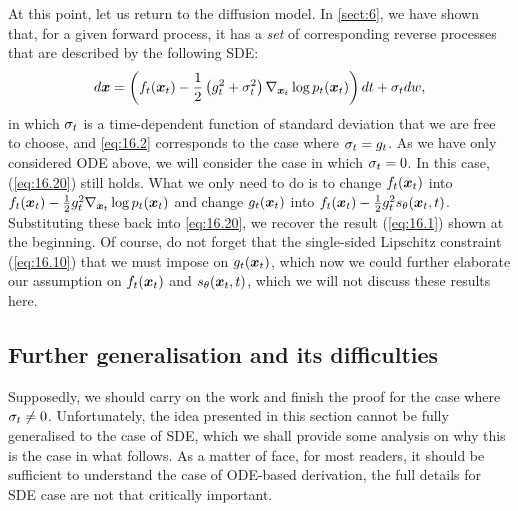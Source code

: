 At this point, let us return to the diffusion model. In \cref{sect:6}, we have shown that, for a given forward process, it has a \emph{set} of corresponding reverse processes that are described by the following SDE:
\begin{equation}
    \label{eq:16.21}
    d\bm{x}=\left(f_t(\bm{x}_{t})-\frac{1}{2}\left(g_t^2+\sigma_t^2\right)\nabla_{\bm{x}_{t}}\log p_t(\bm{x}_{t}) \right)dt+\sigma_t dw,
\end{equation}
in which $\sigma_t$ is a time-dependent function of standard deviation that we are free to choose, and \cref{eq:16.2} corresponds to the case where $\sigma_t=g_t$. As we have only considered ODE above, we will consider the case in which $\sigma_t=0$. In this case, (\ref{eq:16.20}) still holds. What we only need to do is to change $f_t(\bm{x}_{t})$ into $f_t(\bm{x}_{t})-\frac{1}{2}g_t^2\nabla_{\bm{x}_{t}}\log p_t(\bm{x}_{t})$ and change $g_t(\bm{x}_{t})$ into $f_t(\bm{x}_{t})-\frac{1}{2}g_t^2 s_{\theta}(\bm{x}_{t},t)$. Substituting these back into \cref{eq:16.20}, we recover the result (\ref{eq:16.1}) shown at the beginning. Of course, do not forget that the single-sided Lipschitz constraint (\ref{eq:16.10}) that we must impose on $g_t(\bm{x}_{t})$, which now we could further elaborate our assumption on $f_t(\bm{x}_{t})$ and $s_\theta (\bm{x}_{t},t)$, which we will not discuss these results here.

\subsection{Further generalisation and its difficulties}

Supposedly, we should carry on the work and finish the proof for the case where $\sigma_t\neq 0$. Unfortunately, the idea presented in this section cannot be fully generalised to the case of SDE, which we shall provide some analysis on why this is the case in what follows. As a matter of face, for most readers, it should be sufficient to understand the case of ODE-based derivation, the full details for SDE case are not that critically important.


